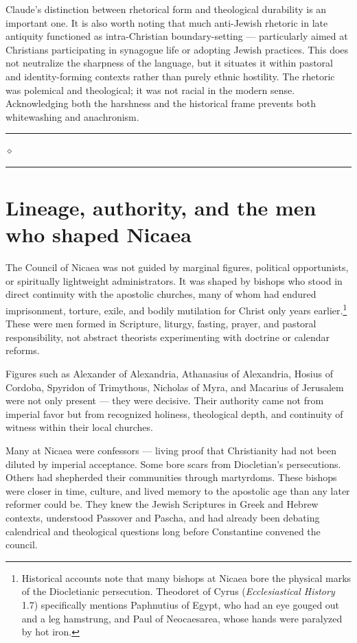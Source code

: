 \documentclass[10pt,twoside,openany]{book}
\newcommand{\ornrule}{%
  \par\bigskip
  {\noindent\hfil{\color{gold}\rule[0.5ex]{1.5in}{0.5pt}%
  \quad$\diamond$\quad%
  \rule[0.5ex]{1.5in}{0.5pt}}\hfil\par}%
  \bigskip
}
\begin{document}
\begin{gptbox}
Claude's distinction between rhetorical form and
theological durability is an important one. It is also
worth noting that much anti-Jewish rhetoric in late
antiquity functioned as intra-Christian boundary-setting
--- particularly aimed at Christians
participating in synagogue life or adopting Jewish
practices. This does not neutralize the sharpness of
the language, but it situates it within pastoral and
identity-forming contexts rather than purely ethnic
hostility. The rhetoric was polemical and theological;
it was not racial in the modern sense. Acknowledging
both the harshness and the historical frame prevents
both whitewashing and anachronism.
\end{gptbox}

\ornrule



\section{Lineage, authority, and the men who shaped Nicaea}

The Council of Nicaea was not guided by marginal figures, political
opportunists, or spiritually lightweight administrators. It was shaped
by bishops who stood in direct continuity with the apostolic churches,
many of whom had endured imprisonment, torture, exile, and bodily
mutilation for Christ only years earlier.\footnote{Historical accounts note that many bishops at Nicaea bore the physical marks of the Diocletianic persecution. Theodoret of Cyrus (\emph{Ecclesiastical History} 1.7) specifically mentions Paphnutius of Egypt, who had an eye gouged out and a leg hamstrung, and Paul of Neocaesarea, whose hands were paralyzed by hot iron.} These were men formed in
Scripture, liturgy, fasting, prayer, and pastoral responsibility, not
abstract theorists experimenting with doctrine or calendar reforms.

Figures such as Alexander of Alexandria, Athanasius of Alexandria,
Hosius of Cordoba, Spyridon of Trimythous, Nicholas of Myra, and
Macarius of Jerusalem were not only present --- they were decisive. Their
authority came not from imperial favor but from recognized holiness,
theological depth, and continuity of witness within their local
churches.

Many at Nicaea were confessors --- living proof that Christianity had not
been diluted by imperial acceptance. Some bore scars from Diocletian's
persecutions. Others had shepherded their communities through
martyrdoms. These bishops were closer in time, culture, and lived
memory to the apostolic age than any later reformer could be. They knew
the Jewish Scriptures in Greek and Hebrew contexts, understood Passover
and Pascha, and had already been debating calendrical and theological
questions long before Constantine convened the council.
\end{document}
